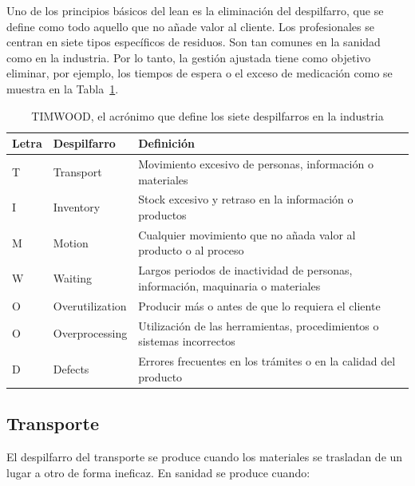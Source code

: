 Uno de los principios básicos del lean es la eliminación del despilfarro, que se define como todo aquello que no añade valor al cliente.
Los profesionales se centran en siete tipos específicos de residuos.
Son tan comunes en la sanidad como en la industria.
Por lo tanto, la gestión ajustada tiene como objetivo eliminar, por ejemplo, los tiempos de espera o el exceso de medicación como se muestra en la Tabla~\ref{tab:timwood}.

\begin{table}[H]
    \centering
    \begin{tabular}{llp{10cm}}
        \toprule
        Letra & Despilfarro     & Definición                                                                         \\
        \midrule
        T     & Transport       & Movimiento excesivo de personas, información o materiales                          \\
        I     & Inventory       & Stock excesivo y retraso en la información o productos                             \\
        M     & Motion          & Cualquier movimiento que no añada valor al producto o al proceso                   \\
        W     & Waiting         & Largos periodos de inactividad de personas, información, maquinaria o   materiales \\
        O     & Overutilization & Producir más o antes de que lo requiera el cliente                                 \\
        O     & Overprocessing  & Utilización de las herramientas, procedimientos o sistemas incorrectos             \\
        D     & Defects         & Errores frecuentes en los trámites o en la calidad del producto                    \\
        \bottomrule
    \end{tabular}
    \caption{TIMWOOD, el acrónimo que define los siete despilfarros en la industria}
    \label{tab:timwood}
\end{table}

\subsection{Transporte}

El despilfarro del transporte se produce cuando los materiales se trasladan de un lugar a otro de forma ineficaz. En sanidad se produce cuando:

